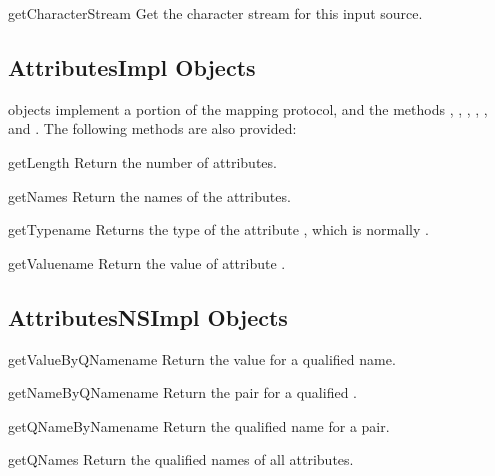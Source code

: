 \begin{methoddesc}[InputSource]{getCharacterStream}{}
  Get the character stream for this input source.
\end{methoddesc}


\subsection{AttributesImpl Objects \label{attributes-impl-objects}}

 objects implement a portion of the mapping
protocol, and the methods , ,
, , , and
.  The following methods are also provided:

\begin{methoddesc}[AttributesImpl]{getLength}{}
  Return the number of attributes.
\end{methoddesc}

\begin{methoddesc}[AttributesImpl]{getNames}{}
  Return the names of the attributes.
\end{methoddesc}

\begin{methoddesc}[AttributesImpl]{getType}{name}
  Returns the type of the attribute , which is normally
  .
\end{methoddesc}

\begin{methoddesc}[AttributesImpl]{getValue}{name}
  Return the value of attribute .
\end{methoddesc}



\subsection{AttributesNSImpl Objects \label{attributes-ns-impl-objects}}

\begin{methoddesc}[AttributesNSImpl]{getValueByQName}{name}
  Return the value for a qualified name.
\end{methoddesc}

\begin{methoddesc}[AttributesNSImpl]{getNameByQName}{name}
  Return the  pair for a
  qualified .
\end{methoddesc}

\begin{methoddesc}[AttributesNSImpl]{getQNameByName}{name}
  Return the qualified name for a  pair.
\end{methoddesc}

\begin{methoddesc}[AttributesNSImpl]{getQNames}{}
  Return the qualified names of all attributes.
\end{methoddesc}
